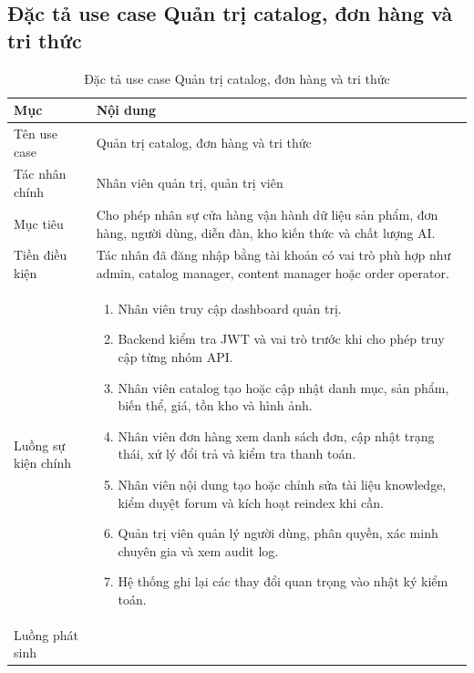 \documentclass[../DoAn.tex]{subfiles}
\begin{document}
\subsection{Đặc tả use case Quản trị catalog, đơn hàng và tri thức}
\label{subsection:2.3.8}

{\normalsize
\setlength{\LTleft}{\fill}
\setlength{\LTright}{\fill}
\setlength{\tabcolsep}{5pt}
\renewcommand{\arraystretch}{1.25}
\begin{longtable}{|p{3.2cm}|p{10.4cm}|}
\caption{Đặc tả use case Quản trị catalog, đơn hàng và tri thức}
\label{table:2.11}\\
\hline
\textbf{Mục} & \textbf{Nội dung} \\ \hline
Tên use case & Quản trị catalog, đơn hàng và tri thức \\ \hline
Tác nhân chính & Nhân viên quản trị, quản trị viên \\ \hline
Mục tiêu & Cho phép nhân sự cửa hàng vận hành dữ liệu sản phẩm, đơn hàng, người dùng, diễn đàn, kho kiến thức và chất lượng AI. \\ \hline
Tiền điều kiện & Tác nhân đã đăng nhập bằng tài khoản có vai trò phù hợp như admin, catalog manager, content manager hoặc order operator. \\ \hline
Luồng sự kiện chính &
\begin{minipage}[t]{10.1cm}
\begin{enumerate}[leftmargin=*,topsep=0pt,itemsep=0pt]
    \item Nhân viên truy cập dashboard quản trị.
    \item Backend kiểm tra JWT và vai trò trước khi cho phép truy cập từng nhóm API.
    \item Nhân viên catalog tạo hoặc cập nhật danh mục, sản phẩm, biến thể, giá, tồn kho và hình ảnh.
    \item Nhân viên đơn hàng xem danh sách đơn, cập nhật trạng thái, xử lý đổi trả và kiểm tra thanh toán.
    \item Nhân viên nội dung tạo hoặc chỉnh sửa tài liệu knowledge, kiểm duyệt forum và kích hoạt reindex khi cần.
    \item Quản trị viên quản lý người dùng, phân quyền, xác minh chuyên gia và xem audit log.
    \item Hệ thống ghi lại các thay đổi quan trọng vào nhật ký kiểm toán.
\end{enumerate}
\end{minipage} \\ \hline
Luồng phát sinh &
\begin{minipage}[t]{10.1cm}

\end{minipage}
\end{longtable}}
\end{document}
